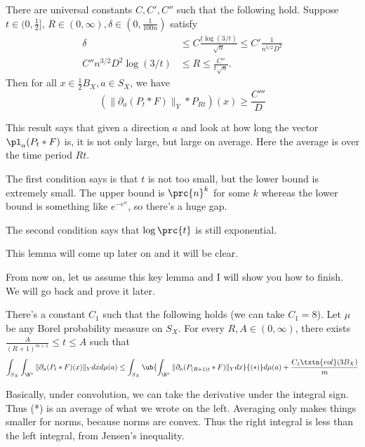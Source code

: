 \begin{lem}
There are universal constants $C,C',C''$ such that the following hold.
Suppose $t \in (0, \frac{1}{2}]$, $R \in (0, \infty),\delta \in (0, \frac{1}{100n})$ satisfy 
\begin{align}
\delta &\leq C \frac{t\log(3/t)}{\sqrt{n}} \leq C' \frac{1}{n^{5/2}D^2}
\label{eq:bdt1-1}
\\
\label{eq:bdt1-2}
 C''n^{3/2}D^2\log(3/t) &\leq R \leq \frac{C''}{t\sqrt{n}}.
\end{align}
Then for all $x \in \frac{1}{2} B_X, a \in S_X$, we have
\[
(\|\partial_a(P_t*F)\|_Y * P_{Rt})(x) \ge \frac{C'''}{D}
\]
\end{lem}
This result says that given a direction $a$ and look at how long the vector $\pl_a (P_t*F)$ is, it is not only large, but large on average. Here the average is over the time period $Rt$. 


The first condition says is that $t$ is not too small, but the lower bound is extremely small. The upper bound is $\prc{n}^{k}$ for some $k$ whereas the lower bound is something like $e^{-e^{n}}$, so there's a huge gap. %

The second condition says that $\log\prc{t}$ is still exponential. 


This lemma will come up later on and it will be clear. 

From now on, let us assume this key lemma and I will show you how to finish. We will go back and prove it later. 

\begin{lem}
There's a constant $C_1$ such that the following holds (we can take $C_1=8$). 
Let $\mu$ be any Borel probability measure on $S_X$. For every $R, A \in (0, \infty)$, there exists $ \frac{A}{(R + 1)^{m + 1}} \leq t \leq A$ such that 
\[
\int_{S_X} \int_{\R^n} \|\partial_a (P_t * F)(x)\|_Y dx d\mu(a) \leq \int_{S_X} \ub{\int_{\R^n} \|\partial_a(P_{(R + 1)t} * F)\|_Y dx}{(*)} d\mu(a) + \frac{C_1\txtn{vol}(3B_X)}{m}
\]
\end{lem}
Basically, under convolution, we can take the derivative under the integral sign. 
Thus (*) is an average of what we wrote on the left. Averaging only makes things smaller for norms, because norms are convex. Thus the  right integral is less than the left integral, from Jensen's inequality. 

